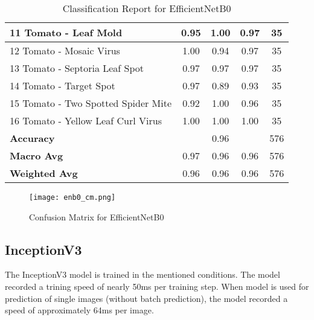 \begin{table}[h!]
{\begin{tabular}{|l|c|c|c|c|}
    11 Tomato - Leaf Mold                             & 0.95               & 1.00            & 0.97              & 35               \\ \hline
    12 Tomato - Mosaic Virus                          & 1.00               & 0.94            & 0.97              & 35               \\ \hline
    13 Tomato - Septoria Leaf Spot                    & 0.97               & 0.97            & 0.97              & 35               \\ \hline
    14 Tomato - Target Spot                           & 0.97               & 0.89            & 0.93              & 35               \\ \hline
    15 Tomato - Two Spotted Spider Mite               & 0.92               & 1.00            & 0.96              & 35               \\ \hline
    16 Tomato - Yellow Leaf Curl Virus                & 1.00               & 1.00            & 1.00              & 35               \\ \hline
    \textbf{Accuracy}                                 & \multicolumn{3}{c|}{0.96}            & 576              \\ \hline
    \textbf{Macro Avg}                                & 0.97               & 0.96            & 0.96              & 576              \\ \hline
    \textbf{Weighted Avg}                             & 0.96               & 0.96            & 0.96              & 576              \\ \hline
    \end{tabular}%
    }
    \caption{Classification Report for EfficientNetB0}
    \label{tab:classification_report_en}
\end{table}


\begin{figure}[h!]
    \centering
    \texttt{[image: enb0\_cm.png]}
    \caption{Confusion Matrix for EfficientNetB0}
    \label{fig:enb0_cm}
\end{figure}


\subsection{InceptionV3}

The InceptionV3 model is trained in the mentioned conditions. The model recorded a trining speed of nearly 50ms per training step. When model is used for prediction of single images (without batch prediction), the model recorded a speed of approximately 64ms per image. 

